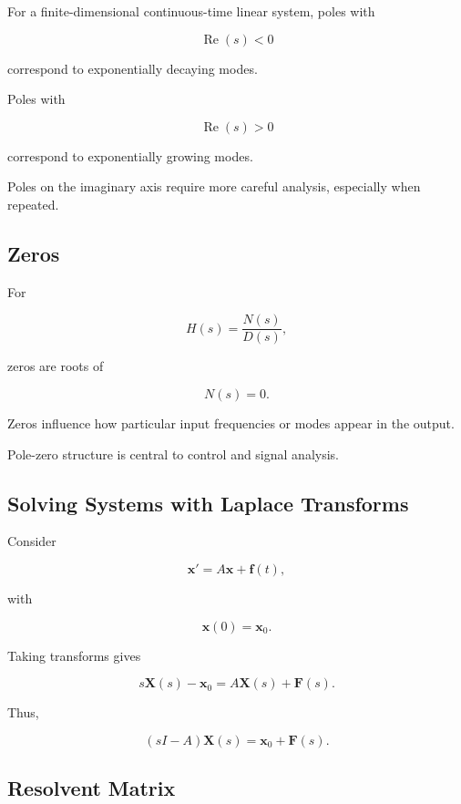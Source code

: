 For a finite-dimensional continuous-time linear system, poles with

\[
\boxed{
\operatorname{Re}(s)<0
}
\]

correspond to exponentially decaying modes.

Poles with

\[
\boxed{
\operatorname{Re}(s)>0
}
\]

correspond to exponentially growing modes.

Poles on the imaginary axis require more careful analysis, especially
when repeated.

\subsection{Zeros}
\label{subsec:transform-zeros}

For

\[
H(s)
=
\frac{
N(s)
}{
D(s)
},
\]

zeros are roots of

\[
\boxed{
N(s)=0.
}
\]

Zeros influence how particular input frequencies or modes appear in the
output.

Pole-zero structure is central to control and signal analysis.

\subsection{Solving Systems with Laplace Transforms}
\label{subsec:laplace-systems}

Consider

\[
\boxed{
\mathbf{x}'
=
A\mathbf{x}
+
\mathbf{f}(t),
}
\]

with

\[
\mathbf{x}(0)
=
\mathbf{x}_0.
\]

Taking transforms gives

\[
s\mathbf{X}(s)
-
\mathbf{x}_0
=
A\mathbf{X}(s)
+
\mathbf{F}(s).
\]

Thus,

\[
\boxed{
(
sI-A
)
\mathbf{X}(s)
=
\mathbf{x}_0
+
\mathbf{F}(s).
}
\]

\subsection{Resolvent Matrix}
\label{subsec:resolvent-matrix}

